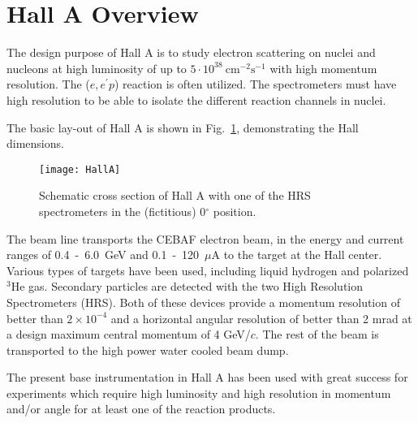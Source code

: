 \section[Hall A Overview]{Hall A Overview}
\label{sec:intro-halla-overview}

The design purpose of Hall A is to study electron scattering 
on nuclei and nucleons at high luminosity
of up to $5\cdot{}10^{38}~\mathrm{cm^{-2}s^{-1}}$ with high momentum
resolution. The ($e,e^{\prime}p$) reaction is often utilized.
The spectrometers must have high resolution 
to be able to isolate the different reaction channels in nuclei.

The basic lay-out of Hall A is shown in Fig.~\ref{fig:HallA-side},
demonstrating the Hall dimensions.

\begin{figure}[htb]
 \begin{center}
    \texttt{[image: HallA]}
 \end{center}
\caption[Hall A schematic cross section]%
{Schematic cross section of Hall A with one of the HRS 
spectrometers in the (fictitious) 0$^\circ$ position. 
}
\label{fig:HallA-side}
\end{figure}

The beam line transports the CEBAF electron beam, in the energy 
and current ranges of 0.4~-~6.0~GeV and 0.1~-~120~$\mu$A to the target
at the Hall center. Various types of targets have been used, including
liquid hydrogen and polarized $^3$He gas. Secondary particles
are detected with the  
two High Resolution Spectrometers (HRS). Both of these devices  
provide a momentum resolution of better than $2\times 10^{-4}$ and a horizontal angular 
resolution of better than 2 mrad at a design maximum central momentum 
of 4 GeV/$c$. The rest of the beam is transported to the high power
water cooled beam dump.

The present base instrumentation in Hall A has been used with great 
success for experiments which require high luminosity and high resolution 
in momentum and/or angle for at least one of the reaction products.
	
